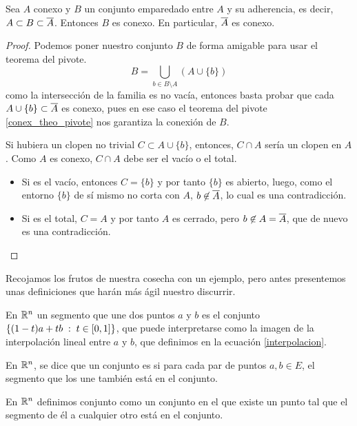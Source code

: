 \begin{theo}[Sandwich]\label{conex_teo_adherencia_conexa}
	Sea $A$ conexo y $B$ un conjunto emparedado entre $A$ y su adherencia, es decir, $A\subset B\subset\overline{A}$. Entonces $B$ es conexo. En particular, $\overline{A}$ es conexo.
\end{theo}
\begin{proof}
	Podemos poner nuestro conjunto $B$ de forma amigable para usar el teorema del pivote.
	\[B=\bigcup_{b\in B\setminus A} (A\cup\{b\}) \]
	como la intersección de la familia es no vacía, entonces basta probar que cada $A\cup\{b\}\subset\overline{A}$ es conexo, pues en ese caso el teorema del pivote \ref{conex_theo_pivote} nos garantiza la conexión de $B$.
	
	Si hubiera un clopen no trivial $C\subset A\cup\{b\}$, entonces, $C\cap A$ sería un clopen en $A$. Como $A$ es conexo, $C\cap A$ debe ser el vacío o el total.
	\begin{itemize}
		\item Si es el vacío, entonces $C=\{b\}$ y por tanto $\{b\}$ es abierto, luego, como el entorno $\{b\}$ de sí mismo no corta con $A$, $b\not\in\overline{A}$, lo cual es una contradicción.
		\item Si es el total, $C=A$ y por tanto $A$ es cerrado, pero $b\not\in A=\overline{A}$, que de nuevo es una contradicción. \qedhere
	\end{itemize}
\end{proof}

Recojamos los frutos de nuestra cosecha con un ejemplo, pero antes presentemos unas definiciones que harán más ágil nuestro discurrir.
\begin{defi}[Segmento]
	En $\mathbb{R}^n$ un segmento que une dos puntos $a$ y $b$ es el conjunto $\{(1-t)a+tb\;:\; t\in[0,1]\}$, que puede interpretarse como la imagen de la interpolación lineal entre $a$ y $b$, que definimos en la ecuación \eqref{interpolacion}.
\end{defi}
\begin{defi}[Convexo]
	En $\mathbb{R}^n$, se dice que un conjunto es  si para cada par de puntos $a,b\in E$, el segmento que los une también está en el conjunto.
\end{defi}
\begin{defi}[Estrellado]
	En $\mathbb{R}^n$ definimos conjunto  como un conjunto en el que existe un punto tal que el segmento de él a cualquier otro está en el conjunto.
\end{defi}

